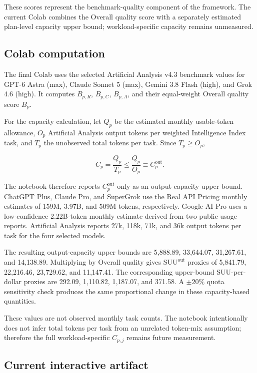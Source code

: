 \documentclass[sigconf,nonacm]{acmart}
\begin{document}
\vspace{0.4em}

These scores represent the benchmark-quality component of the framework.
The current Colab combines the Overall quality score with a separately estimated
plan-level capacity upper bound; workload-specific capacity remains unmeasured.


\subsection{Colab computation}

The final Colab uses the selected Artificial Analysis v4.3 benchmark values for
GPT-6 Astra (max), Claude Sonnet 5 (max), Gemini 3.8 Flash (high), and Grok 4.6
(high). It computes $B_{p,R}$, $B_{p,C}$, $B_{p,A}$, and their equal-weight
Overall quality score $B_p$.

For the capacity calculation, let $Q_p$ be the estimated monthly usable-token
allowance, $O_p$ Artificial Analysis output tokens per weighted Intelligence
Index task, and $T_p$ the unobserved total tokens per task. Since $T_p\ge O_p$,

\[
C_p=\frac{Q_p}{T_p}\le\frac{Q_p}{O_p}\equiv C_p^{\mathrm{out}}.
\]

The notebook therefore reports $C_p^{\mathrm{out}}$ only as an output-capacity
upper bound. ChatGPT Plus, Claude Pro, and SuperGrok use the Real API Pricing
monthly estimates of 159M, 3.97B, and 509M tokens, respectively. Google AI Pro
uses a low-confidence 2.22B-token monthly estimate derived from two public
usage reports. Artificial Analysis reports 27k, 118k, 71k, and 36k output
tokens per task for the four selected models.

The resulting output-capacity upper bounds are 5,888.89, 33,644.07, 31,267.61,
and 14,138.89. Multiplying by Overall quality gives
$\mathrm{SUU}^{\mathrm{out}}$ proxies of 5,841.79, 22,216.46, 23,729.62, and
11,147.41. The corresponding upper-bound SUU-per-dollar proxies are 292.09,
1,110.82, 1,187.07, and 371.58. A $\pm20\%$ quota sensitivity check produces
the same proportional change in these capacity-based quantities.

These values are not observed monthly task counts. The notebook intentionally
does not infer total tokens per task from an unrelated token-mix assumption;
therefore the full workload-specific $C_{p,j}$ remains future measurement.


\subsection{Current interactive artifact}
\end{document}
